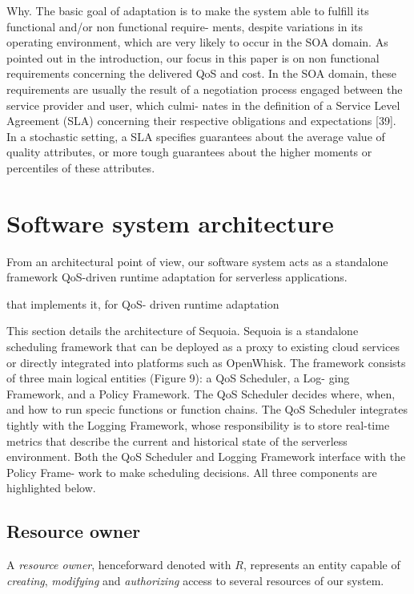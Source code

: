 \documentclass[12pt,a4paper]{report}
\begin{document}
Why. The basic goal of adaptation is to make the system
able to fulfill its functional and/or non functional require-
ments, despite variations in its operating environment,
which are very likely to occur in the SOA domain. As
pointed out in the introduction, our focus in this paper is
on non functional requirements concerning the delivered
QoS and cost. In the SOA domain, these requirements
are usually the result of a negotiation process engaged
between the service provider and user, which culmi-
nates in the definition of a Service Level Agreement (SLA)
concerning their respective obligations and expectations
[39]. In a stochastic setting, a SLA specifies guarantees
about the average value of quality attributes, or more
tough guarantees about the higher moments or percentiles
of these attributes.


\section{Software system architecture}

From an architectural point of view, our software system acts as a standalone framework QoS-driven runtime adaptation for serverless applications.



 that implements it, for QoS-
driven runtime adaptation 


This section details the architecture of Sequoia. Sequoia is a
standalone scheduling framework that can be deployed as a
proxy to existing cloud services or directly integrated into
platforms such as OpenWhisk. The framework consists of
three main logical entities (Figure 9): a QoS Scheduler, a Log-
ging Framework, and a Policy Framework. The QoS Scheduler
decides where, when, and how to run specic functions or
function chains. The QoS Scheduler integrates tightly with
the Logging Framework, whose responsibility is to store
real-time metrics that describe the current and historical
state of the serverless environment. Both the QoS Scheduler
and Logging Framework interface with the Policy Frame-
work to make scheduling decisions. All three components
are highlighted below.






\subsection{Resource owner}

A \textit{resource owner}, henceforward denoted with $R$, represents an entity capable of \textit{creating}, \textit{modifying} and \textit{authorizing} access to several resources of our system.
\end{document}
